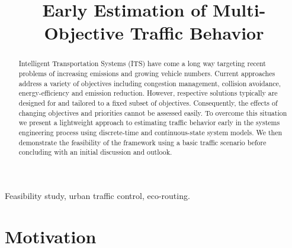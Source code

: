\documentclass[conference]{../cls/IEEEtran}
\begin{document}
\title{Early Estimation of Multi-Objective Traffic Behavior}

\author{
	\and
}

\maketitle

\begin{abstract}
Intelligent Transportation Systems (ITS) have come a long way targeting recent problems of increasing emissions and growing vehicle numbers. Current approaches address a variety of objectives including congestion management, collision avoidance, energy-efficiency and emission reduction. However, respective solutions typically are designed for and tailored to a fixed subset of objectives. Consequently, the effects of changing objectives and priorities cannot be assessed easily. To overcome this situation we present a lightweight approach to estimating traffic behavior early in the systems engineering process using discrete-time and continuous-state system models. We then demonstrate the feasibility of the framework using a basic traffic scenario before concluding with an initial discussion and outlook.
\end{abstract}

\begin{IEEEkeywords}
Feasibility study, urban traffic control, eco-routing.
\end{IEEEkeywords}

\section{Motivation}
\end{document}
